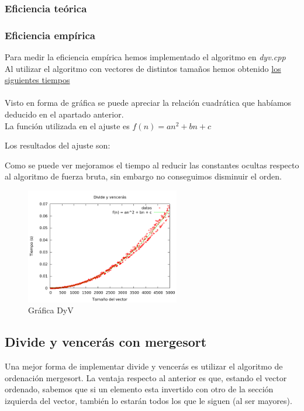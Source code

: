 \subsubsection{Eficiencia teórica}
\subsubsection{Eficiencia empírica}
Para medir la eficiencia empírica hemos implementado el algoritmo en \textit{dyv.cpp}\\

Al utilizar el algoritmo con vectores de distintos tamaños hemos obtenido \hyperref[tabla_comp]{los siguientes tiempos}\\\\

Visto en forma de gráfica se puede apreciar la relación cuadrática que habíamos deducido en el apartado anterior.\\

La función utilizada en el ajuste es $f(n) = an^2 + bn + c$

Los resultados del ajuste son:\\

\begin{center}
\end{center}

Como se puede ver mejoramos el tiempo al reducir las constantes ocultas respecto al algoritmo de fuerza bruta, sin embargo no conseguimos disminuir el orden.

\begin{figure}[h] 
\centering
	\includegraphics[width=0.6\textwidth]{../Opcional/Graficas/dyv_bruno.png}
	\caption{Gráfica DyV} 
	\label{fig:perros} 
\end{figure}


\subsection{Divide y vencerás con mergesort}
Una mejor forma de implementar divide y vencerás es utilizar el algoritmo de ordenación mergesort. La ventaja respecto al anterior es que, estando el vector ordenado, sabemos que si un elemento esta invertido con otro de la sección izquierda del vector, también lo estarán todos los que le siguen (al ser mayores).

